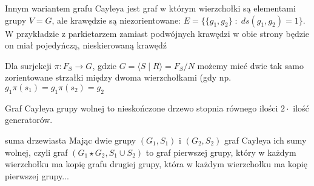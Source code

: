 Innym wariantem grafu Cayleya jest graf w którym wierzchołki są elementami grupy $V=G$, ale krawędzie są niezorientowane: $E=\{\{g_1, g_2\}\;:\;ds(g_1,g_2)=1\}$. W przykładzie z parkietarzem zamiast podwójnych krawędzi w obie strony będzie on miał pojedyńczą, nieskierowaną krawędź


Dla surjekcji $\pi:F_S\to G$, gdzie $G=\langle S\;|\; R\rangle=F_S/N$ możemy mieć dwie tak samo zorientowane strzałki między dwoma wierzchołkami (gdy np. $g_1\pi(s_1)=g_1\pi(s_2)=g_2$
\begin{center}
\end{center}

Graf Cayleya grupy wolnej to nieskończone drzewo stopnia równego ilości $2\cdot$ ilość generatorów. 

\begin{definition}{suma drzewiasta}{}
  Mając dwie grupy $(G_1, S_1)$ i $(G_2, S_2)$ graf Cayleya ich sumy wolnej, czyli graf $(G_1\star G_2, S_1\cup S_2)$ to graf pierwszej grupy, który w każdym wierzchołku ma kopię grafu drugiej grupy, która w każdym wierzchołku ma kopię pierwszej grupy...

  \begin{center}
    \begin{tikzpicture}

    \end{tikzpicture}
  \end{center}
\end{definition}
